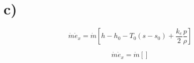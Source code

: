 

\section*{c)}

\[
\dot{m} \dot{e}_x = \dot{m} \left[ h - h_0 - T_0 (s - s_0) + \frac{k_e}{2} \frac{p}{\rho} \right]
\]

\[
\dot{m} \dot{e}_x = \dot{m} \left[ \right]
\]